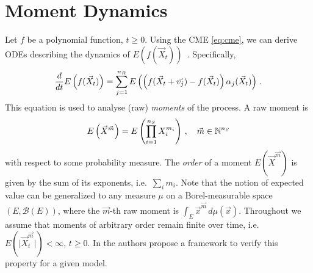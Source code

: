 \section{Moment Dynamics}\label{sec:moments_bg}
Let $f$ be a polynomial function, $t\ge0$.
Using the \ac{CME} \eqref{eq:cme}, we can derive \acp{ODE}
describing the dynamics of $E(f(\vec{X}_t))$~\cite{engblom2006computing}.
Specifically,
\begin{equation}\label{eq:mom_ode}
    \frac{d}{dt}{E}\left(f(\vec X_t)\right) = \sum_{j=1}^{n_R}{E}\left(\left(f({\vec X_t +
    \vec{v_j}}) - f(\vec X_t)\right)\alpha_j(\vec X_t)\right)\,.
\end{equation}
This equation is used to analyse (raw) \emph{moments} of the process.
A raw moment is
$${E}\left(\vec X^{\vec m}\right)={E}\left(\prod_{i=1}^{n_S} X_i^{m_i}\right)\,,\quad \vec m\in {\mathbb{N}}^{n_S}$$
with respect to some probability measure.
The \emph{order} of a moment $E({\vec X}^{\vec m})$ is given by the sum of its exponents,
i.e.\ $\sum_i m_i$.
Note that the notion of  expected value can be generalized
to any measure $\mu$ on a Borel-measurable space
$(E, \mathcal{B}(E))$, where
 the $\vec{m}$-th raw moment is $\int_E {\vec x}^{\vec m}\,d\mu(\vec x)$.
Throughout we assume that moments of arbitrary order remain finite over time,
i.e.\ $E(\lvert \vec{X}^{\vec{m}}_t\rvert)<\infty$, $t\geq 0$.
In \citet{gupta2014scalable} the authors propose a framework to verify
this property for a given model.

